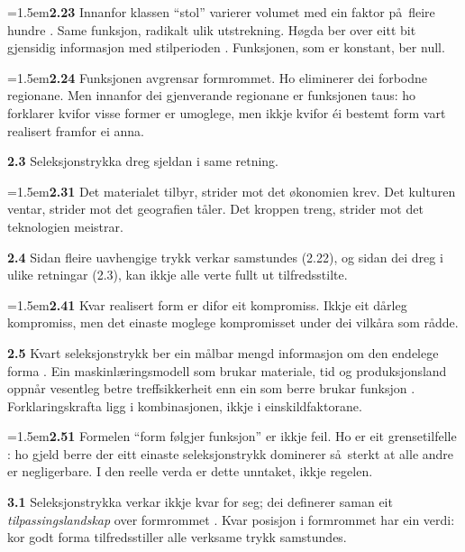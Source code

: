 \documentclass[11pt, a4paper]{article}
\newcommand{\prop}[1]{\bigskip\noindent{\Large\textbf{#1}}\medskip\par}
\newcommand{\subprop}[1]{\medskip\noindent\textbf{#1}\quad}
\newcommand{\subsubprop}[1]{\smallskip\hangindent=1.5em\noindent\hspace{1.5em}\textbf{#1}\quad}
\begin{document}
\subsubprop{2.23} Innanfor klassen ``stol'' varierer volumet med ein faktor p\aa\ fleire hundre \citep{finne2026}. Same funksjon, radikalt ulik utstrekning. H\o gda ber over eitt bit gjensidig informasjon med stilperioden \citep[jf.][]{shannon1948, cover2006}. Funksjonen, som er konstant, ber null.

\subsubprop{2.24} Funksjonen avgrensar formrommet. Ho eliminerer dei forbodne regionane. Men innanfor dei gjenverande regionane er funksjonen taus: ho forklarer kvifor visse former er umoglege, men ikkje kvifor \'ei bestemt form vart realisert framfor ei anna.

\subprop{2.3} Seleksjonstrykka dreg sjeldan i same retning.

\subsubprop{2.31} Det materialet tilbyr, strider mot det \o konomien krev. Det kulturen ventar, strider mot det geografien t\aa ler. Det kroppen treng, strider mot det teknologien meistrar.

\subprop{2.4} Sidan fleire uavhengige trykk verkar samstundes (2.22), og sidan dei dreg i ulike retningar (2.3), kan ikkje alle verte fullt ut tilfredsstilte.

\subsubprop{2.41} Kvar realisert form er difor eit kompromiss. Ikkje eit d\aa rleg kompromiss, men det einaste moglege kompromisset under dei vilk\aa ra som r\aa dde.

\subprop{2.5} Kvart seleksjonstrykk ber ein m\aa lbar mengd informasjon om den endelege forma \citep[jf.][]{shannon1948}. Ein maskinl\ae ringsmodell \citep[jf.][]{breiman2001} som brukar materiale, tid og produksjonsland oppn\aa r vesentleg betre treffsikkerheit enn ein som berre brukar funksjon \citep{finne2026}. Forklaringskrafta ligg i kombinasjonen, ikkje i einskildfaktorane.

\subsubprop{2.51} Formelen ``form f\o lgjer funksjon'' \citep{sullivan1896} er ikkje feil. Ho er eit grensetilfelle \citep[sjå][for ei historisk-kritisk lesing]{michl_fff}: ho gjeld berre der eitt einaste seleksjonstrykk dominerer s\aa\ sterkt at alle andre er negligerbare. I den reelle verda er dette unntaket, ikkje regelen.

\prop{3 Kreftene lagar eit tilpassingslandskap.}

\subprop{3.1} Seleksjonstrykka verkar ikkje kvar for seg; dei definerer saman eit \textit{tilpassingslandskap} over formrommet \citep{wright1932, kauffman1993, gavrilets2004}. Kvar posisjon i formrommet har ein verdi: kor godt forma tilfredsstiller alle verksame trykk samstundes.
\end{document}
